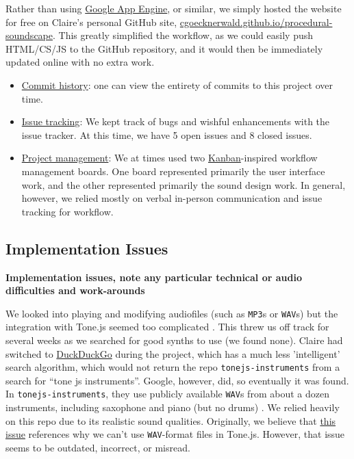 \documentclass[12pt,a4paper]{article}
\newcommand{\code}{\texttt}
\newcommand{\lightcode}[1]{\colorbox{light-gray}{\texttt{#1}}}
\begin{document}
Rather than using \href{https://cloud.google.com/appengine/}{Google App Engine}, or similar, we simply hosted the website for free on Claire's personal GitHub site, \href{https://cgoecknerwald.github.io/procedural-soundscape}{cgoecknerwald.github.io/procedural-soundscape}. This greatly simplified the workflow, as we could easily push HTML/CS/JS to the GitHub repository, and it would then be immediately updated online with no extra work.

\begin{itemize}
	\item \href{https://github.com/cgoecknerwald/procedural-soundscape/commits/master}{Commit history}: one can view the entirety of commits to this project over time.
	\item \href{https://github.com/cgoecknerwald/procedural-soundscape/issues}{Issue tracking}: We kept track of bugs and wishful enhancements with the issue tracker. At this time, we have 5 open issues and 8 closed issues.
	\item \href{https://github.com/cgoecknerwald/procedural-soundscape/projects}{Project management}: We at times used two \href{https://en.wikipedia.org/wiki/Kanban_(development)}{Kanban}-inspired workflow management boards. One board represented primarily the user interface work, and the other represented primarily the sound design work. In general, however, we relied mostly on verbal in-person communication and issue tracking for workflow.
\end{itemize}

\subsection{Implementation Issues}
\textbf{Implementation issues, note any particular technical or audio difficulties and work-arounds}

We looked into playing and modifying audiofiles (such as \code{MP3}s or \code{WAV}s) but the integration with Tone.js seemed too complicated \cite{tonejs-issue}. This threw us off track for several weeks as we searched for good synths to use (we found none). Claire had switched to \href{https://duckduckgo.com/}{DuckDuckGo} during the project, which has a much less 'intelligent' search algorithm, which would not return the repo \lightcode{tonejs-instruments} from a search for ``tone js instruments''. Google, however, did, so eventually it was found. In \lightcode{tonejs-instruments}, they use publicly available \code{WAV}s from about a dozen instruments, including saxophone and piano (but no drums) \cite{tonejs-instruments}.  We relied heavily on this repo due to its realistic sound qualities. Originally, we believe that \href{https://github.com/Tonejs/Tone.js/issues/290}{this issue} references why we can't use \code{WAV}-format files in Tone.js. However, that issue seems to be outdated, incorrect, or misread.
\end{document}

